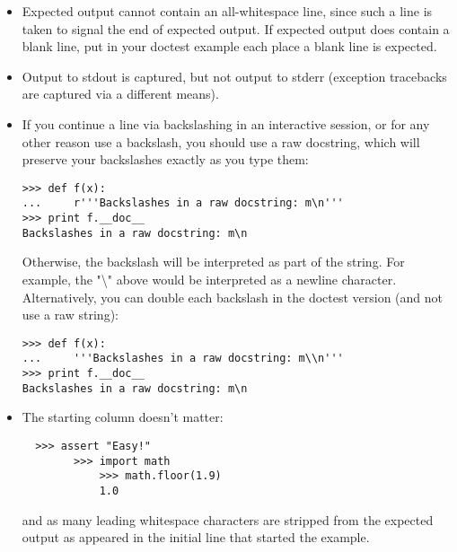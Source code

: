 \begin{itemize}

\item Expected output cannot contain an all-whitespace line, since such a
  line is taken to signal the end of expected output.  If expected
  output does contain a blank line, put  in your
  doctest example each place a blank line is expected.

\item Output to stdout is captured, but not output to stderr (exception
  tracebacks are captured via a different means).

\item If you continue a line via backslashing in an interactive session,
  or for any other reason use a backslash, you should use a raw
  docstring, which will preserve your backslashes exactly as you type
  them:

\begin{verbatim}
>>> def f(x):
...     r'''Backslashes in a raw docstring: m\n'''
>>> print f.__doc__
Backslashes in a raw docstring: m\n
\end{verbatim}

  Otherwise, the backslash will be interpreted as part of the string.
  For example, the "{\textbackslash}" above would be interpreted as a
  newline character.  Alternatively, you can double each backslash in the
  doctest version (and not use a raw string):

\begin{verbatim}
>>> def f(x):
...     '''Backslashes in a raw docstring: m\\n'''
>>> print f.__doc__
Backslashes in a raw docstring: m\n
\end{verbatim}

\item The starting column doesn't matter:

\begin{verbatim}
  >>> assert "Easy!"
        >>> import math
            >>> math.floor(1.9)
            1.0
\end{verbatim}

and as many leading whitespace characters are stripped from the
expected output as appeared in the initial  line
that started the example.
\end{itemize}

